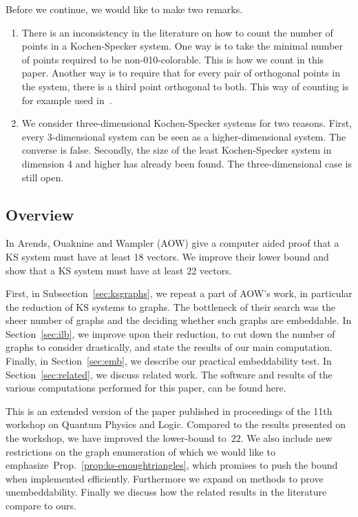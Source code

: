 \documentclass{report}
\begin{document}
Before we continue, we would like to make two remarks.
\begin{enumerate}
\item
There is an inconsistency in the literature on how to count the number
of points in a Kochen-Specker system.  One way is to take the minimal
number of points required to be non-010-colorable.
This is how we count in this paper.
Another way is to require that for every pair of orthogonal points
in the system, there is a third point orthogonal to both.
This way of counting is for example used in~\cite{pavivcic}.
\item
We consider three-dimensional Kochen-Specker systems
for two reasons.
First, every 3-dimensional system can be seen as a higher-dimensional
            system.   The converse is false.
Secondly, the size of the least Kochen-Specker system
            in dimension 4 and higher has already been found.\cite{pavivcic}
            The three-dimensional case is still open.
\end{enumerate}

\subsection{Overview}
In \cite{aow11} Arends, Ouaknine and Wampler (AOW) give a computer aided proof
that a KS system must have at least 18 vectors.  We improve their lower bound
and show that a KS system must have at least 22 vectors.

First, in Subsection~\ref{sec:ksgraphs},
we repeat a part of AOW's work, in particular the reduction of
KS systems to graphs.
The bottleneck of their search was the sheer number of graphs
and the deciding whether such graphs are embeddable.
In Section~\ref{sec:ilb},
we improve upon their reduction,
to cut down the number of graphs to consider drastically,
and state the results of our main computation.
Finally, in Section~\ref{sec:emb},
we describe our practical embeddability test.
In Section~\ref{sec:related},
we discuss related work.
The software and results of the various computations performed for
this paper, can be found here\cite{GH}.

This is an extended version of the paper published in proceedings
of the 11th workshop on Quantum Physics and Logic.\cite{UW14}
Compared to the results presented on the workshop,
we have improved the lower-bound to~$22$.
We also include new restrictions on the graph enumeration
of which we would like to emphasize~Prop.~\ref{prop:ks-enoughtriangles},
which promises to push the bound when implemented efficiently.
Furthermore we expand on methods to prove unembeddability.
Finally we discuss how the related results in the literature
compare to ours.
\end{document}
